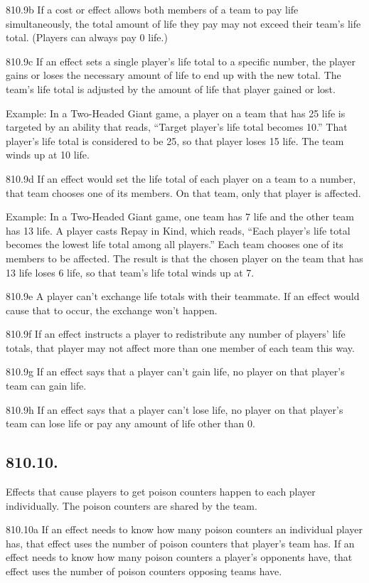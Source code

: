 810.9b If a cost or effect allows both members of a team to pay life simultaneously, the total amount of life they pay may not exceed their team’s life total. (Players can always pay 0 life.)

810.9c If an effect sets a single player’s life total to a specific number, the player gains or loses the necessary amount of life to end up with the new total. The team’s life total is adjusted by the amount of life that player gained or lost.

Example: In a Two-Headed Giant game, a player on a team that has 25 life is targeted by an ability that reads, “Target player’s life total becomes 10.” That player’s life total is considered to be 25, so that player loses 15 life. The team winds up at 10 life.

810.9d If an effect would set the life total of each player on a team to a number, that team chooses one of its members. On that team, only that player is affected.

Example: In a Two-Headed Giant game, one team has 7 life and the other team has 13 life. A player casts Repay in Kind, which reads, “Each player’s life total becomes the lowest life total among all players.” Each team chooses one of its members to be affected. The result is that the chosen player on the team that has 13 life loses 6 life, so that team’s life total winds up at 7.

810.9e A player can’t exchange life totals with their teammate. If an effect would cause that to occur, the exchange won’t happen.

810.9f If an effect instructs a player to redistribute any number of players’ life totals, that player may not affect more than one member of each team this way.

810.9g If an effect says that a player can’t gain life, no player on that player’s team can gain life.

810.9h If an effect says that a player can’t lose life, no player on that player’s team can lose life or pay any amount of life other than 0.

\subsection*{810.10.}
Effects that cause players to get poison counters happen to each player individually. The poison counters are shared by the team.

810.10a If an effect needs to know how many poison counters an individual player has, that effect uses the number of poison counters that player’s team has. If an effect needs to know how many poison counters a player’s opponents have, that effect uses the number of poison counters opposing teams have.

